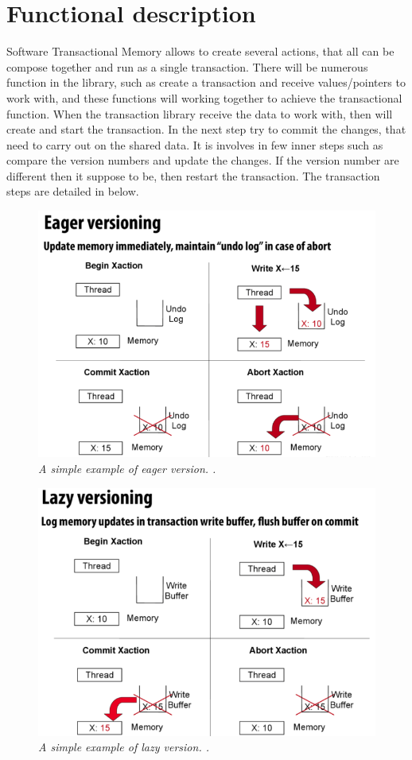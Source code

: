 \documentclass[12pt]{article}
\begin{document}
\section{Functional description}
Software Transactional Memory allows to create several actions, that all can be compose together and run as a single transaction. There will be numerous function in the library, such as create a transaction and receive values/pointers to work with, and these functions will working together to achieve the transactional function. When the transaction library receive the data to work with, then will create and start the transaction. In the next step try to commit the changes, that need to carry out on the shared data. It is involves in few inner steps such as compare the version numbers and update the changes. If the version number are different then it suppose to be, then restart the transaction. The transaction steps are detailed in below.

\begin{figure}[h!]
\centering
\includegraphics[scale=0.4]{Pictures/eager.png}
\caption{\textit{\color{gray}A simple example of eager version. \cite{Xelblade}.}}
\end{figure}

\begin{figure}[h!]
\centering
\includegraphics[scale=0.4]{Pictures/lazy.png}
\caption{\textit{\color{gray}A simple example of lazy version. \cite{Xelblade}.}}
\end{figure}
\end{document}
